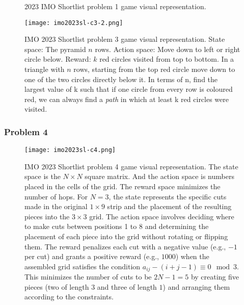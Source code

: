 \begin{figure}[htb]
  \centering
  
  \begin{subfigure}[b]{0.49\textwidth}
    \centering
    \setlength{\fboxsep}{0.5pt} 
    \setlength{\fboxrule}{0.5pt} 
    
  \end{subfigure}
  \hfill 
  \begin{subfigure}[b]{0.49\textwidth}
    \centering
    \setlength{\fboxsep}{0.5pt} 
    \setlength{\fboxrule}{0.5pt} 
    
  \end{subfigure}
  \caption{2023 IMO Shortlist problem 1 game visual representation.}
  \label{fig:imo2023sl-c1}
\end{figure}



\begin{figure}[H]
  \centering
   \texttt{[image: imo2023sl-c3-2.png]}
  \caption{IMO 2023 Shortlist problem 3 game visual representation. State space: The pyramid $n$ rows. Action space: Move down to left or right circle below. Reward: $k$ red circles visited from top to bottom.  In a triangle with $n$ rows, starting from the top red circle move down to one of the two circles directly below it. In terms of n, find the largest value of k such that if one circle from every row is coloured red, we can always find a \textit{path} in which at least k red circles were visited.}
   \label{fig:imo2023sl-c3-2}
\end{figure}

\newpage
\clearpage

\subsubsection*{Problem 4}
\label{appendix:G_2023_IMO_Shortlist_C4}

\begin{figure}[htb]
  \centering
   \texttt{[image: imo2023sl-c4.png]}
   \caption{
   IMO 2023 Shortlist problem 4 game visual representation. The state space is the $N \times N$ square matrix. And the action space is numbers placed in the cells of the grid.
   The reward space minimizes the number of hops.
   For $N = 3$, the state represents the specific cuts made in the original $1 \times 9 $ strip and the placement of the resulting pieces into the $3 \times 3$ grid. 
   The action space involves deciding where to make cuts between positions 1 to 8 and determining the placement of each piece into the grid without rotating or flipping them. 
The reward penalizes each cut with a negative value (e.g., $-1$ per cut) and grants a positive reward (e.g., $1000$) when the assembled grid satisfies the condition $a_{ij} - (i + j - 1) \equiv 0 \mod 3 $. 
This minimizes the number of cuts to be $2N - 1 = 5$ by creating five pieces (two of length $3$ and three of length $1$) and arranging them according to the constraints.}
   \label{fig:imo2023sl-c4}
\end{figure}

